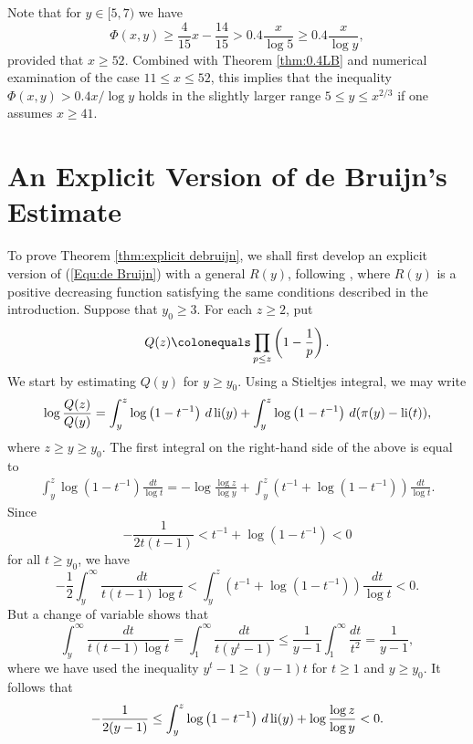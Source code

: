 \documentclass[12pt,reqno]{amsart}
\begin{document}
\begin{rmk}
Note that for $y\in[5,7)$ we have
\[\Phi(x,y)\ge\frac{4}{15}x-\frac{14}{15}>0.4\frac{x}{\log 5}\ge0.4\frac{x}{\log y},\]
provided that $x\ge 52$. Combined with Theorem \ref{thm:0.4LB} and numerical examination of the case $11\le x\le 52$, this implies that the inequality $\Phi(x,y)>0.4x/\log y$ holds in the slightly larger range $5\le y\le x^{2/3}$ if one assumes $x\ge 41$.
\end{rmk}

\vspace*{2mm}
\section{An Explicit Version of de Bruijn's Estimate}\label{S:de Bruijn}
To prove Theorem \ref{thm:explicit debruijn}, we shall first develop an explicit version of (\ref{Equ:de Bruijn}) with a general $R(y)$, following \cite{Br}, where $R(y)$ is a positive decreasing function satisfying the same conditions described in the introduction. Suppose that $y_0\ge3$. For each $z\ge 2$, put
\[Q(z)\colonequals\prod_{p\leq z}\left(1-\frac{1}{p}\right).\]
We start by estimating $Q(y)$ for $y\ge y_0$. Using a Stieltjes integral, we may write
\begin{equation}\label{Equ1:logQ(z)/Q(y)}
\log\frac{Q(z)}{Q(y)}=\int_{y}^{z}\log\left(1-t^{-1}\right)\,d\operatorname{li}(y)+\int_{y}^{z}\log\left(1-t^{-1}\right)\,d(\pi(y)-\operatorname{li}(t)),
\end{equation}
where $z\ge y\ge y_0$. The first integral on the right-hand side of the above is equal to
\begin{align*}
\int_{y}^{z}\log\left(1-t^{-1}\right)\frac{dt}{\log t}=-\log\frac{\log z}{\log y}+\int_{y}^{z}\left(t^{-1}+\log\left(1-t^{-1}\right)\right)\frac{dt}{\log t}.
\end{align*}
Since 
\[ -\frac{1}{2t(t-1)}<t^{-1}+\log\left(1-t^{-1}\right)<0\]
for all $t\ge y_0$, we have 
\[-\frac{1}{2}\int_{y}^{\infty}\frac{dt}{t(t-1)\log t}<\int_{y}^{z}\left(t^{-1}+\log\left(1-t^{-1}\right)\right)\frac{dt}{\log t}<0.\]
But a change of variable shows that
\[\int_{y}^{\infty}\frac{dt}{t(t-1)\log t}=\int_{1}^{\infty}\frac{dt}{t(y^t-1)}\le\frac{1}{y-1}\int_{1}^{\infty}\frac{dt}{t^2}=\frac{1}{y-1},\]
where we have used the inequality $y^t-1\ge (y-1)t$ for $t\ge 1$ and $y\ge y_0$. It follows that
\begin{equation}\label{Equ:1stint}
-\frac{1}{2(y-1)}\le\int_{y}^{z}\log\left(1-t^{-1}\right)\,d\operatorname{li}(y)+\log\frac{\log z}{\log y}<0.
\end{equation}
\end{document}
